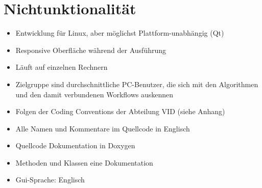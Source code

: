 \section{Nichtunktionalität}
		\begin{itemize} 
			\item Entwicklung für Linux, aber möglichst Plattform-unabhängig (Qt)
			\item Responsive Oberfläche während der Ausführung
			\item Läuft auf einzelnen Rechnern
			\item Zielgruppe sind durchschnittliche PC-Benutzer, die sich mit den Algorithmen und den damit verbundenen Workflows auskennen
			\item Folgen der Coding Conventions der Abteilung VID (siehe Anhang)
			\item Alle Namen und Kommentare im Quellcode in Englisch
			\item Quellcode Dokumentation in Doxygen
			\item Methoden und Klassen eine Dokumentation
			\item Gui-Sprache: Englisch
		\end{itemize}